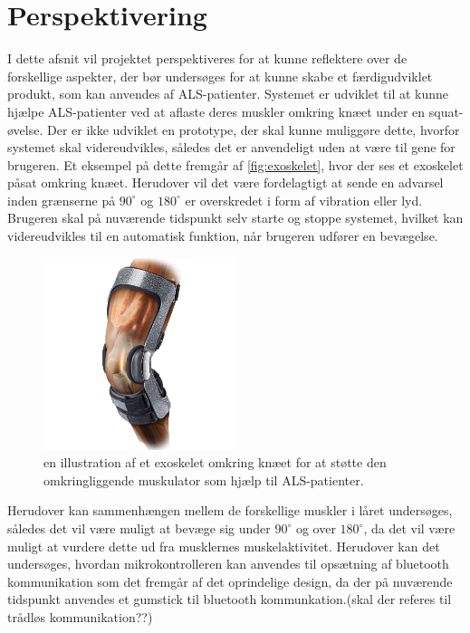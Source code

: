 \section{Perspektivering}
I dette afsnit vil projektet perspektiveres for at kunne reflektere over de forskellige aspekter, der bør undersøges for at kunne skabe et færdigudviklet produkt, som kan anvendes af ALS-patienter. Systemet er udviklet til at kunne hjælpe ALS-patienter ved at aflaste deres muskler omkring knæet under en squat-øvelse. Der er ikke udviklet en prototype, der skal kunne muliggøre dette, hvorfor systemet skal videreudvikles, således det er anvendeligt uden at være til gene for brugeren. Et eksempel på dette fremgår af \autoref{fig:exoskelet}, hvor der ses et exoskelet påsat omkring knæet. Herudover vil det være fordelagtigt at sende en advarsel inden grænserne på $90^{\circ}$ og $180^{\circ}$ er overskredet i form af vibration eller lyd. Brugeren skal på nuværende tidspunkt selv starte og stoppe systemet, hvilket kan videreudvikles til en automatisk funktion, når brugeren udfører en bevægelse. 

\begin{figure}[H]
\centering
\includegraphics[width=0.5\textwidth]{figures/exoskelet}
\caption{en illustration af et exoskelet omkring knæet for at støtte den omkringliggende muskulator som hjælp til ALS-patienter.}
\label{fig:exoskelet}
\end{figure}

\noindent
Herudover kan sammenhængen mellem de forskellige muskler i låret undersøges, således det vil være muligt at bevæge sig under $90^{\circ}$ og over $180^{\circ}$, da det vil være muligt at vurdere dette ud fra musklernes muskelaktivitet. Herudover kan det undersøges, hvordan mikrokontrolleren kan anvendes til opsætning af bluetooth kommunikation som det fremgår af det oprindelige design, da der på nuværende tidspunkt anvendes et gumstick til bluetooth kommunkation.(skal der referes til trådløs kommunikation??)

